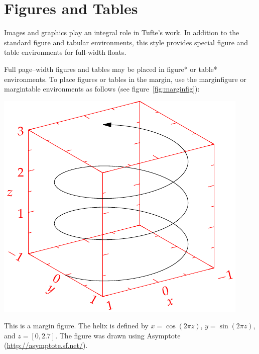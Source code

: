 \documentclass{tufte-handout}
\newcommand{\docenv}[1]{\textsf{#1}}%
\begin{document}
\section{Figures and Tables}\label{sec:figures-and-tables}
Images and graphics play an integral role in Tufte's work.
In addition to the standard \docenv{figure} and \docenv{tabular} environments,
this style provides special figure and table environments for full-width
floats.

Full page--width figures and tables may be placed in \docenv{figure*} or
\docenv{table*} environments.  To place figures or tables in the margin,
use the \docenv{marginfigure} or \docenv{margintable} environments as follows
(see figure~\ref{fig:marginfig}):

\begin{marginfigure}%
  \includegraphics[width=\linewidth]{helix}
  \caption{This is a margin figure.  The helix is defined by 
    $x = \cos(2\pi z)$, $y = \sin(2\pi z)$, and $z = [0, 2.7]$.  The figure was
    drawn using Asymptote (\url{http://asymptote.sf.net/}).}
  \label{fig:marginfig}
\end{marginfigure}
\end{document}
